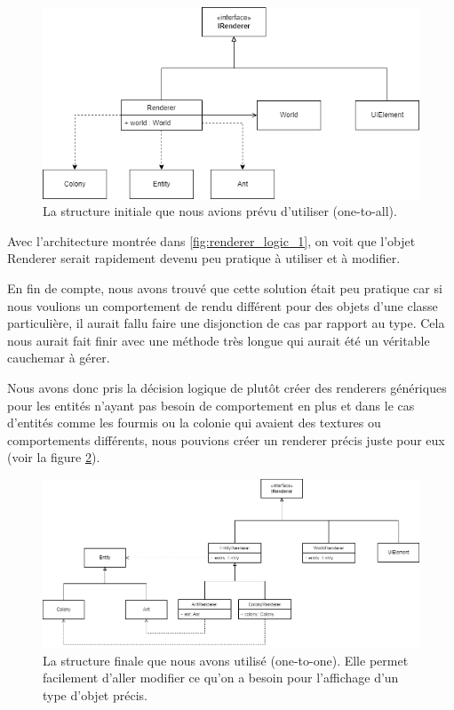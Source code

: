 \documentclass{EPUProjetDi}
\begin{document}
\begin{figure}[h]
    \centering
    \includegraphics[scale=0.5]{renderer_logic_1.png}
    \caption{La structure initiale que nous avions prévu d'utiliser (one-to-all). }
    \label{fig:renderer_logic_1}
\end{figure}

Avec l'architecture montrée dans \autoref{fig:renderer_logic_1}, on voit que l'objet Renderer serait rapidement devenu peu pratique 
à utiliser et à modifier.

En fin de compte, nous avons trouvé que cette solution était peu pratique car si nous voulions un comportement 
de rendu différent pour des objets d'une classe particulière, il aurait fallu faire une disjonction de cas par rapport au type. Cela nous aurait fait finir avec
une méthode très longue qui aurait été un véritable cauchemar à gérer. 

Nous avons donc pris la décision logique de plutôt créer des renderers génériques pour les entités n'ayant pas besoin de comportement 
en plus et dans le cas d'entités comme les fourmis ou la colonie qui avaient des textures ou comportements différents, nous pouvions créer un renderer
précis juste pour eux (voir la figure \ref{fig:renderer_logic_2}).

\begin{figure}[H]
    \centering
    \includegraphics[scale=0.3]{renderer_logic_2.png}
    \caption{La structure finale que nous avons utilisé (one-to-one). Elle permet facilement d'aller modifier ce qu'on a besoin pour l'affichage d'un type d'objet précis.}
    \label{fig:renderer_logic_2}
\end{figure}
\end{document}
